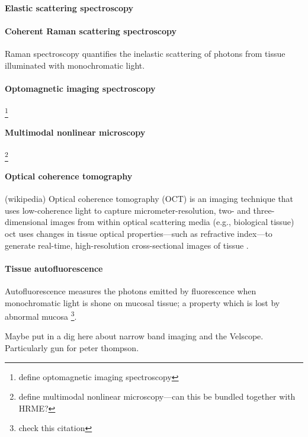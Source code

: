 \paragraph{Elastic scattering spectroscopy} \cite{grilloneg.a.ColorCancerMargin2017}
\paragraph{Coherent Raman scattering spectroscopy} \cite{hoeslir.c.CoherentRamanScattering2017} Raman spectroscopy quantifies the inelastic scattering of photons from tissue illuminated with monochromatic light.
\paragraph{Optomagnetic imaging spectroscopy} \cite{lisulb.PredictiveValueOptomagnetic2019}\footnote{define optomagnetic imaging spectroscopy} 
\paragraph{Multimodal nonlinear microscopy} \cite{heukes.MultimodalNonlinearMicroscopy2016}\footnote{define multimodal nonlinear microscopy---can this be bundled together with HRME?} 
\paragraph{Optical coherence tomography} (wikipedia) Optical coherence tomography (OCT) is an imaging technique that uses low-coherence light to capture micrometer-resolution, two- and three-dimensional images from within optical scattering media (e.g., biological tissue) \cite{hamdoonz.OpticalCoherenceTomography2016} \Gls{oct} uses changes in tissue optical properties---such as refractive index---to generate real-time, high-resolution cross-sectional images of tissue \cite{heidaria.e.UseOpticalCoherence2020}.
\paragraph{Tissue autofluorescence} \cite{ohnishiy.UsefulnessFluorescenceVisualization2016} Autofluorescence measures the photons emitted by fluorescence when monochromatic light is shone on mucosal tissue; a property which is lost by abnormal mucosa \cite{leey.-j.IntraoperativeFluorescenceGuidedSurgery2020}\footnote{check this citation}.

Maybe put in a dig here about narrow band imaging and the Velscope. 
Particularly gun for peter thompson.

